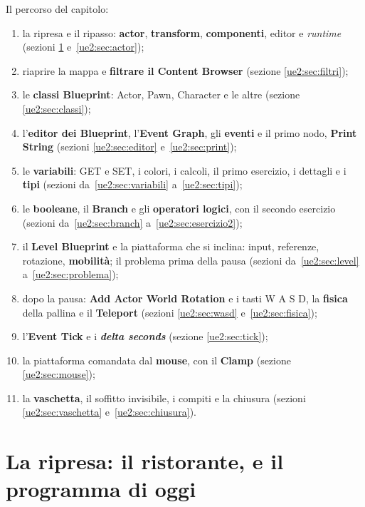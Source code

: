 Il percorso del capitolo:
\begin{enumerate}
  \item la ripresa e il ripasso: \textbf{actor}, \textbf{transform},
        \textbf{componenti}, editor e \emph{runtime} (sezioni \ref{ue2:sec:ripresa}
        e~\ref{ue2:sec:actor});
  \item riaprire la mappa e \textbf{filtrare il Content Browser} (sezione
        \ref{ue2:sec:filtri});
  \item le \textbf{classi Blueprint}: Actor, Pawn, Character e le altre (sezione
        \ref{ue2:sec:classi});
  \item l'\textbf{editor dei Blueprint}, l'\textbf{Event Graph}, gli \textbf{eventi} e il
        primo nodo, \textbf{Print String} (sezioni \ref{ue2:sec:editor}
        e~\ref{ue2:sec:print});
  \item le \textbf{variabili}: GET e SET, i colori, i calcoli, il primo esercizio, i
        dettagli e i \textbf{tipi} (sezioni da~\ref{ue2:sec:variabili}
        a~\ref{ue2:sec:tipi});
  \item le \textbf{booleane}, il \textbf{Branch} e gli \textbf{operatori logici}, con il
        secondo esercizio (sezioni da~\ref{ue2:sec:branch} a~\ref{ue2:sec:esercizio2});
  \item il \textbf{Level Blueprint} e la piattaforma che si inclina: input, referenze,
        rotazione, \textbf{mobilità}; il problema prima della pausa (sezioni
        da~\ref{ue2:sec:level} a~\ref{ue2:sec:problema});
  \item dopo la pausa: \textbf{Add Actor World Rotation} e i tasti W A S D, la
        \textbf{fisica} della pallina e il \textbf{Teleport} (sezioni
        \ref{ue2:sec:wasd} e~\ref{ue2:sec:fisica});
  \item l'\textbf{Event Tick} e i \textbf{\emph{delta seconds}} (sezione
        \ref{ue2:sec:tick});
  \item la piattaforma comandata dal \textbf{mouse}, con il \textbf{Clamp} (sezione
        \ref{ue2:sec:mouse});
  \item la \textbf{vaschetta}, il soffitto invisibile, i compiti e la chiusura (sezioni
        \ref{ue2:sec:vaschetta} e~\ref{ue2:sec:chiusura}).
\end{enumerate}

\section{La ripresa: il ristorante, e il programma di oggi}
\label{ue2:sec:ripresa}

